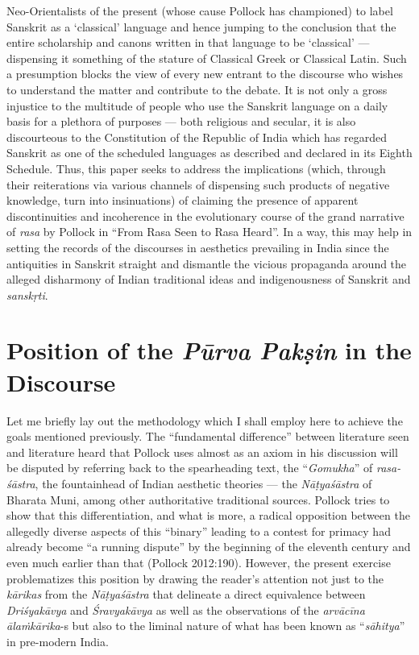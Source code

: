 Neo-Orientalists of the present (whose cause Pollock has championed) to label Sanskrit as a ‘classical’ language and hence jumping to the conclusion that the entire scholarship and canons written in that language to be ‘classical’ --- dispensing it something of the stature of Classical Greek or Classical Latin. Such a presumption blocks the view of every new entrant to the discourse who wishes to understand the matter and contribute to the debate. It is not only a gross injustice to the multitude of people who use the Sanskrit language on a daily basis for a plethora of purposes --- both religious and secular, it is also discourteous to the Constitution of the Republic of India which has regarded Sanskrit as one of the scheduled languages as described and declared in its Eighth Schedule. Thus, this paper seeks to address the implications (which, through their reiterations via various channels of dispensing such products of negative knowledge, turn into insinuations) of claiming the presence of apparent discontinuities and incoherence in the evolutionary course of the grand narrative of \textsl{rasa} by Pollock in “From Rasa Seen to Rasa Heard”. In a way, this may help in setting the records of the discourses in aesthetics prevailing in India since the antiquities in Sanskrit straight and dismantle the vicious propaganda around the alleged disharmony of Indian traditional ideas and indigenousness of Sanskrit and \textsl{sanskṛti}.\\[-21pt]

\section*{Position of the \textsl{Pūrva Pakṣin} in the Discourse}

Let me briefly lay out the methodology which I shall employ here to achieve the goals mentioned previously. The “fundamental difference” between literature seen and literature heard that Pollock uses almost as an axiom in his discussion will be disputed by referring back to the spearheading text, the “\textsl{Gomukha}” of \textsl{rasa-śāstra}, the fountainhead of Indian aesthetic theories --- the \textsl{Nāṭyaśāstra} of Bharata Muni, among other authoritative traditional sources. Pollock tries to show that this differentiation, and what is more, a radical opposition between the allegedly diverse aspects of this “binary” leading to a contest for primacy had already become “a running dispute” by the beginning of the eleventh century and even much earlier than that (Pollock 2012:190). However, the present exercise problematizes this position by drawing the reader’s attention not just to the \textsl{kārikas} from the \textsl{Nāṭyaśāstra} that delineate a direct equivalence between \textsl{Driśyakāvya} and \textsl{Śravyakāvya} as well as the observations of the \textsl{arvācīna ālaṁkārika}-s but also to the liminal nature of what has been known as “\textsl{sāhitya}” in pre-modern India. 

